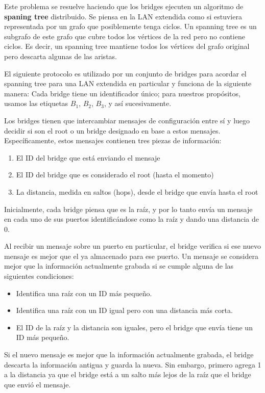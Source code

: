 Este problema se resuelve haciendo que los bridges ejecuten un algoritmo de \textbf{spaning tree} distribuido. Se piensa en la LAN extendida como si estuviera representada por un grafo que posiblemente tenga ciclos. Un spanning tree es un subgrafo de este grafo que cubre todos los vértices de la red pero no contiene ciclos. Es decir, un spanning tree mantiene todos los vértices del grafo original pero descarta algunas de las aristas.

El siguiente protocolo es utilizado por un conjunto de bridges para acordar el spanning tree para una LAN extendida en particular y funciona de la siguiente manera: Cada bridge tiene un identificador único; para nuestros propósitos, usamos las etiquetas \(B_1\), \(B_2\), \(B_3\), y así sucesivamente.

Los bridges tienen que intercambiar mensajes de configuración entre sí y luego decidir si son el root o un bridge designado en base a estos mensajes. Específicamente, estos mensajes contienen tres piezas de información:
\begin{enumerate}
  \item El ID del bridge que está enviando el mensaje
  \item El ID del bridge que es considerado el root (hasta el momento)
  \item La distancia, medida en saltos (hops), desde el bridge que envía hasta el root
\end{enumerate}

Inicialmente, cada bridge piensa que es la raíz, y por lo tanto envía un mensaje en cada uno de sus puertos identificándose como la raíz y dando una distancia de 0. 

Al recibir un mensaje sobre un puerto en particular, el bridge verifica si ese nuevo mensaje es mejor que el ya almacenado para ese puerto. Un mensaje se considera mejor que la información actualmente grabada si se cumple alguna de las siguientes condiciones:
\begin{itemize}
  \item Identifica una raíz con un ID más pequeño.
  \item Identifica una raíz con un ID igual pero con una distancia más corta.
  \item El ID de la raíz y la distancia son iguales, pero el bridge que envía tiene un ID más pequeño.
\end{itemize}

Si el nuevo mensaje es mejor que la información actualmente grabada, el bridge descarta la información antigua y guarda la nueva. Sin embargo, primero agrega 1 a la distancia ya que el bridge está a un salto más lejos de la raíz que el bridge que envió el mensaje.


